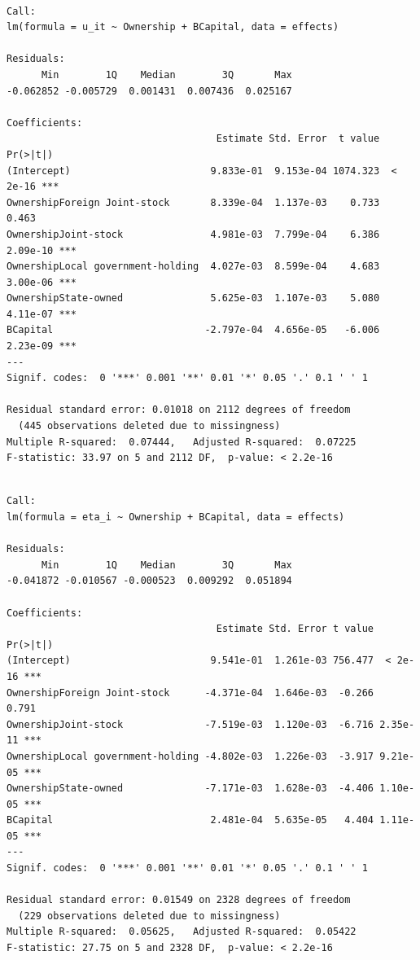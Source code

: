\documentclass[
  letterpaper,
  DIV=11,
  numbers=noendperiod]{scrreprt}
\begin{document}
\begin{verbatim}

Call:
lm(formula = u_it ~ Ownership + BCapital, data = effects)

Residuals:
      Min        1Q    Median        3Q       Max 
-0.062852 -0.005729  0.001431  0.007436  0.025167 

Coefficients:
                                    Estimate Std. Error  t value Pr(>|t|)    
(Intercept)                        9.833e-01  9.153e-04 1074.323  < 2e-16 ***
OwnershipForeign Joint-stock       8.339e-04  1.137e-03    0.733    0.463    
OwnershipJoint-stock               4.981e-03  7.799e-04    6.386 2.09e-10 ***
OwnershipLocal government-holding  4.027e-03  8.599e-04    4.683 3.00e-06 ***
OwnershipState-owned               5.625e-03  1.107e-03    5.080 4.11e-07 ***
BCapital                          -2.797e-04  4.656e-05   -6.006 2.23e-09 ***
---
Signif. codes:  0 '***' 0.001 '**' 0.01 '*' 0.05 '.' 0.1 ' ' 1

Residual standard error: 0.01018 on 2112 degrees of freedom
  (445 observations deleted due to missingness)
Multiple R-squared:  0.07444,   Adjusted R-squared:  0.07225 
F-statistic: 33.97 on 5 and 2112 DF,  p-value: < 2.2e-16
\end{verbatim}

\begin{verbatim}

Call:
lm(formula = eta_i ~ Ownership + BCapital, data = effects)

Residuals:
      Min        1Q    Median        3Q       Max 
-0.041872 -0.010567 -0.000523  0.009292  0.051894 

Coefficients:
                                    Estimate Std. Error t value Pr(>|t|)    
(Intercept)                        9.541e-01  1.261e-03 756.477  < 2e-16 ***
OwnershipForeign Joint-stock      -4.371e-04  1.646e-03  -0.266    0.791    
OwnershipJoint-stock              -7.519e-03  1.120e-03  -6.716 2.35e-11 ***
OwnershipLocal government-holding -4.802e-03  1.226e-03  -3.917 9.21e-05 ***
OwnershipState-owned              -7.171e-03  1.628e-03  -4.406 1.10e-05 ***
BCapital                           2.481e-04  5.635e-05   4.404 1.11e-05 ***
---
Signif. codes:  0 '***' 0.001 '**' 0.01 '*' 0.05 '.' 0.1 ' ' 1

Residual standard error: 0.01549 on 2328 degrees of freedom
  (229 observations deleted due to missingness)
Multiple R-squared:  0.05625,   Adjusted R-squared:  0.05422 
F-statistic: 27.75 on 5 and 2328 DF,  p-value: < 2.2e-16
\end{verbatim}
\end{document}

